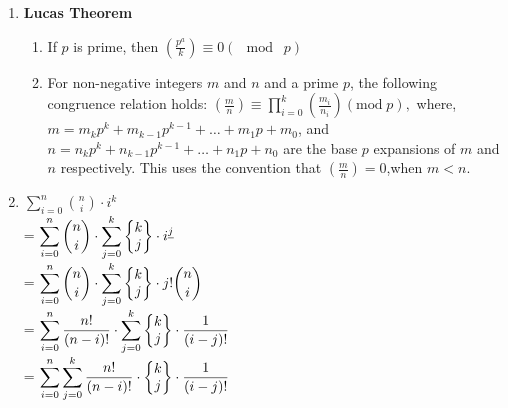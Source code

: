 \begin{enumerate}
\[\begin{cases}
                  n \cdot T(n-1, k) \\ - F(n-1, k) \\ \cdot T(n-k-1, k) & ;n > k \\
              \end{cases}\]
          Here $\displaystyle F(n, k) = n \cdot (n - 1) \cdot \dots \cdot (n - k + 1)$
    \item \textbf{Lucas Theorem}
          \begin{enumerate}
              \item If $\displaystyle p$ is prime, then $\displaystyle \left(\frac{p^{a}}{k}\right) \equiv 0 (\mod\; p)$
              \item For non-negative integers $m$ and $n$ and a prime $\displaystyle p$, the following congruence relation holds:
                    \(\displaystyle \left(\frac{m}{n}\right) \equiv \prod_{i=0}^{k} \left(\frac{m_{i}}{n_{i}}\right) (\text{mod}\; p),\)
                    where,
                    $m=m_{k} p^{k} +m_{k-1} p^{k-1}+\dots+m_{1} p+m_{0}$,
                    and
                    $n=n_{k}p^{k}+n_{k-1}p^{k-1}+\dots+n_{1}p+n_{0}$
                    are the base $\displaystyle p$ expansions of $m$ and $n$ respectively. This uses the convention that $\displaystyle \left(\frac{m}{n}\right)=0$,when $m<n$.
          \end{enumerate}
    \item $\displaystyle \sum_{i=0}^{n}  {n \choose i } \cdot i^{k}$
          \\= $\displaystyle \sum_{i=0}^{n}  {n \choose i } \cdot \sum_{j=0}^{k}{ \left\{ \begin{matrix} k\cr j \end{matrix} \right\} \cdot i^{\underline{j}}}$
          \\= $\displaystyle \sum_{i=0}^{n} {n \choose i } \cdot \sum_{j=0}^{k} \left\{ \begin{matrix} k\cr j \end{matrix} \right\} \cdot  j! {n \choose i }$
          \\= $\displaystyle \sum_{i=0}^{n} \frac{n!}{(n-i)!} \cdot \sum_{j=0}^{k} \left\{ \begin{matrix}k\cr j \end{matrix} \right\} \cdot \frac{1}{(i-j)!}$
          \\= $\displaystyle \sum_{i=0}^{n} \sum_{j=0}^{k} \frac{n!}{(n-i)!} \cdot  \left\{\begin{matrix} k\cr j \end{matrix} \right\} \cdot \frac{1}{(i-j)!}$

\end{enumerate}
